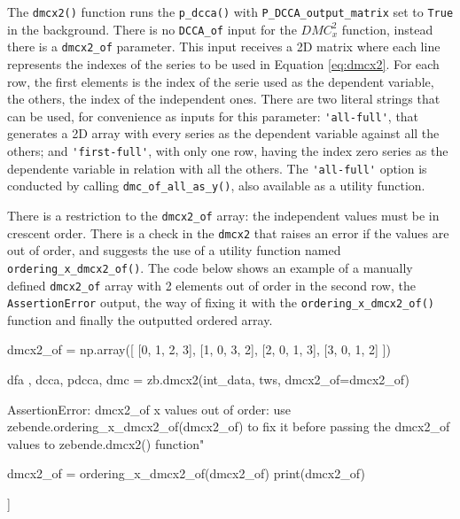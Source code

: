 \documentclass[article]{jss}
\begin{document}
The \verb"dmcx2()" function runs the \verb"p_dcca()" with \verb"P_DCCA_output_matrix" set to \verb"True" in the background. There is no \verb"DCCA_of" input for the $DMC_x^2$ function, instead there is a \verb"dmcx2_of" parameter. This input receives a 2D matrix where each line represents the indexes of the series to be used in Equation \ref{eq:dmcx2}. For each row, the first elements is the index of the serie used as the dependent variable, the others, the index of the independent ones. There are two literal strings that can be used, for convenience as inputs for this parameter: \verb"'all-full'", that generates a 2D array with every series as the dependent variable against all the others; and \verb"'first-full'", with only one row, having the index zero series as the dependente variable in relation with all the others. The \verb"'all-full'" option is conducted by calling \verb"dmc_of_all_as_y()", also available as a utility function.

There is a restriction to the \verb"dmcx2_of" array: the independent values must be in crescent order. There is a check in the \verb"dmcx2" that raises an error if the values are out of order, and suggests the use of a utility function named \verb"ordering_x_dmcx2_of()". The code below shows an example of a manually defined \verb"dmcx2_of" array with 2 elements out of order in the second row, the \verb"AssertionError" output, the way of fixing it with the \verb"ordering_x_dmcx2_of()" function and finally the outputted ordered array.

\begin{CodeChunk}
  \begin{CodeInput}
dmcx2_of = np.array([ [0, 1, 2, 3],
                      [1, 0, 3, 2],
                      [2, 0, 1, 3],
                      [3, 0, 1, 2]  ])

dfa , dcca, pdcca, dmc = zb.dmcx2(int_data, tws, dmcx2_of=dmcx2_of)
  \end{CodeInput}
  \begin{CodeOutput}
AssertionError: 
dmcx2_of x values out of order: 
use zebende.ordering_x_dmcx2_of(dmcx2_of)
 to fix it before passing the dmcx2_of values to zebende.dmcx2() function"
  \end{CodeOutput}
  \begin{CodeInput}
dmcx2_of = ordering_x_dmcx2_of(dmcx2_of)
print(dmcx2_of)
  \end{CodeInput}
  \begin{CodeOutput}
[[0 1 2 3]
 [1 0 2 3]
 [2 0 1 3]
 [3 0 1 2]]
  \end{CodeOutput}
\end{CodeChunk}
\end{document}
